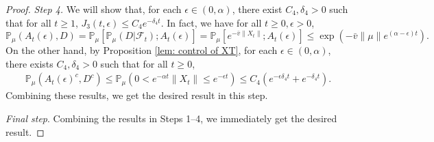 \documentclass[12pt,a4paper]{amsart}
\theoremstyle{plain}
\theoremstyle{definition}
\numberwithin{equation}{section}
\begin{document}
\begin{proof}
\emph{Step 4.}
We will show that, for each $\epsilon\in (0,  \alpha)$, there exist $C_4,\delta_4>0$ such that for all $t\geq 1$, $J_3(t,\epsilon)\leq C_4e^{-\delta_4 t}.$
In fact, we have  for all $t\geq 0, \epsilon >0$,
\[
  \mathbb P_{\mu}(A_{t}(\epsilon), D)
  = \mathbb P_{\mu}[\mathbb P_{\mu}(D|\mathscr F_t);A_t(\epsilon)]
  = \mathbb P_\mu[e^{-\bar v\|X_t\|};A_t(\epsilon)]
  \leq \exp({-\bar v \|\mu\|e^{(\alpha - \epsilon)t}}).
\]
On the other hand, by Proposition \ref{lem: control of XT}, for each $\epsilon \in (0, \alpha)$, there exists  $C_{4}, \delta_{4}>0$ such that for all $t\geq 0$,
\begin{align}
  \mathbb P_\mu(A_t(\epsilon)^c,D^c)
  \leq \mathbb P_\mu(0 < e^{-\alpha t}\|X_t\|
  \leq e^{ - \epsilon t}) \leq C_{4} (e^{-\epsilon \delta_{4} t}+e^{-\delta_{4} t}).
\end{align}
 Combining these results, we get the desired result in this step.

 \emph{Final step}. Combining the results in Steps 1--4, we immediately get the desired result.
\end{proof}
\end{document}
